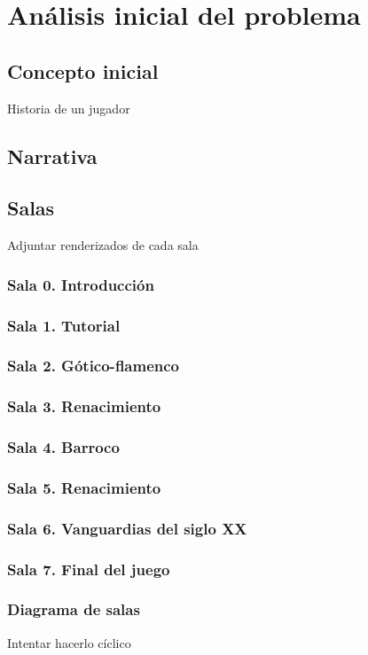 \chapter{Análisis inicial del problema}
\label{chap:analisis_problema}

\section{Concepto inicial}

Historia de un jugador

\section{Narrativa}

\section{Salas}

Adjuntar renderizados de cada sala

\subsection{Sala 0. Introducción}

\subsection{Sala 1. Tutorial}

\subsection{Sala 2. Gótico-flamenco}

\subsection{Sala 3. Renacimiento}

\subsection{Sala 4. Barroco}

\subsection{Sala 5. Renacimiento}

\subsection{Sala 6. Vanguardias del siglo XX}

\subsection{Sala 7. Final del juego}

\subsection{Diagrama de salas}

Intentar hacerlo cíclico